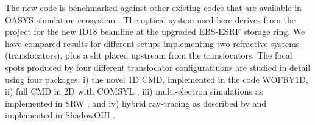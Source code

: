 \documentclass{iucr}              %
\begin{document}
The new code is benchmarked against other existing codes that are available in OASYS simulation ecosystem \cite{codeOASYS}. The optical system used here derives from the project for the new ID18 beamline at the upgraded EBS-ESRF storage ring. We have compared results for different setups implementing two refractive systems (transfocators), plus a slit placed upstream from the transfocators. The focal spots produced by four different transfocator configuratiuons are studied in detail using four packages: i) the novel 1D CMD, implemented in the code WOFRY1D, ii) full CMD in 2D with COMSYL \cite{codeCOMSYL}, iii) multi-electron simulations as implemented in SRW \cite{codeSRW}, and iv) hybrid ray-tracing as described by  and implemented in ShadowOUI \cite{codeSHADOWOUI}.




\end{document}

